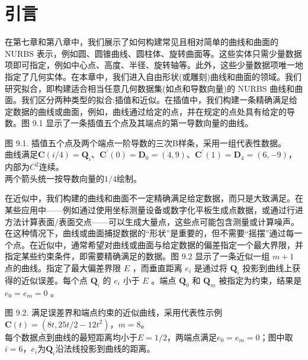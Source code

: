 \documentclass[../main.tex]{subfiles}
\begin{document}
\section{引言}

在第七章和第八章中，我们展示了如何构建常见且相对简单的曲线和曲面的 NURBS 表示，例如圆、圆锥曲线、圆柱体、旋转曲面等。这些实体只需少量数据项即可指定，例如中心点、高度、半径、旋转轴等。此外，这些少量数据项唯一地指定了几何实体。在本章中，我们进入自由形状(或雕刻)曲线和曲面的领域。我们研究拟合，即构建适合相当任意几何数据集(如点和导数向量)的 NURBS 曲线和曲面。我们区分两种类型的拟合:插值和近似。在插值中，我们构建一条精确满足给定数据的曲线或曲面，例如，曲线通过给定的点，并在规定的点处具有给定的导数。图 9.1 显示了一条插值五个点及其端点的第一导数向量的曲线。

\begin{center}
\begin{minipage}{27cm}
\vspace*{.6\baselineskip}
\centering
{}
\par\smallskip
图 9.1. 插值五个点及两个端点一阶导数的三次B样条，采用一组代表性数据。\\
曲线满足$\mathbf C(i/4)=\mathbf Q_i$、$\mathbf C^{\prime}(0)=\mathbf D_0=(4,9)$、$\mathbf C^{\prime}(1)=\mathbf D_4=(6,-9)$，内部为$C^2$连续。\\
两个箭头统一按导数向量的$1/4$绘制。
\end{minipage}
\end{center}

在近似中，我们构建的曲线和曲面不一定精确满足给定数据，而只是大致满足。在某些应用中——例如通过使用坐标测量设备或数字化平板生成点数据，或通过行进方法计算表面/表面交点——可以生成大量点，这些点可能包含测量或计算噪声。在这种情况下，曲线或曲面捕捉数据的“形状”是重要的，但不需要“摇摆”通过每一个点。在近似中，通常希望对曲线或曲面与给定数据的偏差指定一个最大界限，并指定某些约束条件，即需要精确满足的数据。图 9.2 显示了一条近似一组 \(m + 1\) 点的曲线。指定了最大偏差界限 \(E\) ，而垂直距离 \({e}_{i}\) 是通过将 \({\mathbf{Q}}_{i}\) 投影到曲线上获得的近似误差。每个点 \({\mathbf{Q}}_{i}\) 的 \({e}_{i}\) 小于 \(E\) 。端点 \({\mathbf{Q}}_{0}\) 和 \({\mathbf{Q}}_{m}\) 被指定为约束，结果是 \({e}_{0} = {e}_{m} = 0\) 。





\begin{center}
\begin{minipage}{27cm}
\vspace*{.6\baselineskip}
\centering
{}
\par\smallskip
图 9.2. 满足误差界和端点约束的近似曲线，采用代表性示例$\mathbf C(t)=(8t,25t/2-12t^2)$，$m=8$。\\
每个数据点到曲线的最短距离均小于$E=1/2$，两端点满足$e_0=e_m=0$；图中取$i=6$，$e_i$为$\mathbf Q_i$沿法线投影到曲线的距离。
\end{minipage}
\end{center}
\end{document}
